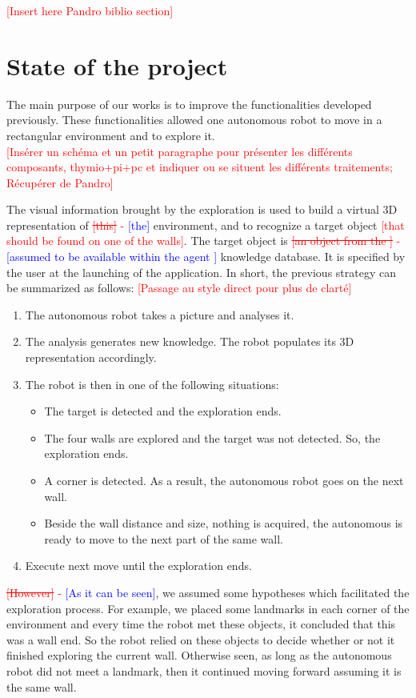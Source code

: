 \documentclass[12pt]{report}
\newcommand{\hcr}[2]{\textcolor{red}{\sout{[#1]} - \textcolor{blue}{ [#2]}}}
\newcommand{\hc}[1]{\textcolor{red}{[#1]}}
\begin{document}
\hc{Insert here Pandro biblio section}


\section{State of the project}

	The main purpose of our works is to improve the functionalities developed previously. These functionalities 
allowed one autonomous robot to move in a rectangular environment and to explore it.\\


\hc{Insérer un schéma et un petit paragraphe pour présenter les différents composants, thymio+pi+pc et indiquer ou se 
situent les différents traitements; Récupérer de Pandro}


	The visual information brought by the exploration is used to build a virtual 3D representation of 
\hcr{this}{the} environment, and to recognize a target object \hc{that should be found on one of the walls}. The target 
object is \hcr{an object from the }{assumed to be available within the agent } knowledge database. It is specified by 
the user at the launching of the application.
In short, the previous strategy can be summarized as follows:
\hc{Passage au style direct pour plus de clarté}
	\begin{enumerate}
		\item The autonomous robot takes a picture and analyses it.
		\item The analysis generates new knowledge. The robot populates its 3D representation accordingly. 
		\item The robot is then in one of the following situations:
		\begin{itemize}
			\item The target is detected and the exploration ends.
			\item The four walls are explored and the target was not detected. So, the exploration ends.
			\item A corner is detected. As a result, the autonomous robot goes on the next wall.
			\item Beside the wall distance and size, nothing is acquired, the autonomous is ready to move 
to the next part of the same wall.
		\end{itemize}
		\item Execute next move until the exploration ends.
	\end{enumerate}

	
	
	\hcr{However}{As it can be seen}, we assumed some hypotheses which facilitated the exploration process. For 
example, we placed some landmarks in each corner of the environment and every time the robot met 
these objects, it concluded that this was a wall end. So the robot relied on these objects to decide whether 
or not it finished exploring the current wall. Otherwise seen, as long as the autonomous robot did not meet a landmark, 
then it continued moving forward assuming it is the same wall.\\
	
\end{document}
